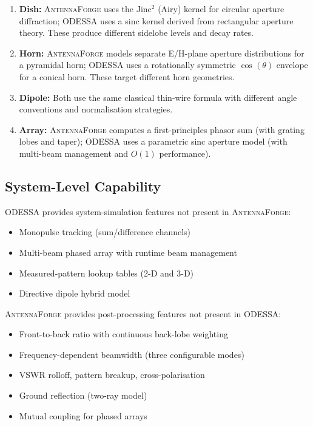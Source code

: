 \documentclass[11pt,a4paper]{article}
\newcommand{\AF}{\textsc{AntennaForge}}
\newcommand{\OD}{\textsc{ODESSA}}
\begin{document}
\begin{enumerate}[leftmargin=2em]
  \item \textbf{Dish:} \AF{} uses the Jinc$^2$ (Airy) kernel for circular
    aperture diffraction; \OD{} uses a sinc kernel derived from rectangular
    aperture theory.  These produce different sidelobe levels and decay rates.
  \item \textbf{Horn:} \AF{} models separate E/H-plane aperture distributions
    for a pyramidal horn; \OD{} uses a rotationally symmetric $\cos(\theta)$
    envelope for a conical horn.  These target different horn geometries.
  \item \textbf{Dipole:} Both use the same classical thin-wire formula with
    different angle conventions and normalisation strategies.
  \item \textbf{Array:} \AF{} computes a first-principles phasor sum (with
    grating lobes and taper); \OD{} uses a parametric sinc aperture model
    (with multi-beam management and $O(1)$ performance).
\end{enumerate}

\subsection{System-Level Capability}

\OD{} provides system-simulation features not present in \AF{}:
\begin{itemize}[leftmargin=2em]
  \item Monopulse tracking (sum/difference channels)
  \item Multi-beam phased array with runtime beam management
  \item Measured-pattern lookup tables (2-D and 3-D)
  \item Directive dipole hybrid model
\end{itemize}

\AF{} provides post-processing features not present in \OD{}:
\begin{itemize}[leftmargin=2em]
  \item Front-to-back ratio with continuous back-lobe weighting
  \item Frequency-dependent beamwidth (three configurable modes)
  \item VSWR rolloff, pattern breakup, cross-polarisation
  \item Ground reflection (two-ray model)
  \item Mutual coupling for phased arrays
\end{itemize}
\end{document}
